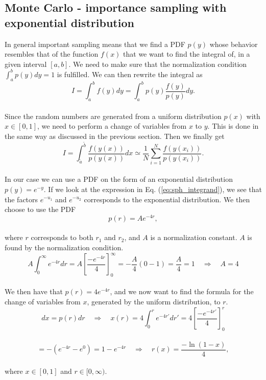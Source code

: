 \documentclass[12pt]{article}
\begin{document}
\begin{flushleft}
\subsection{Monte Carlo - importance sampling with exponential distribution}
In general important sampling means that we find a PDF $p(y)$ whose behavior resembles that of the function $f(x)$ that we want to find the integral of, in a given interval $[a,b]$. We need to make sure that the normalization condition $\int_a^b p(y)dy = 1$ is fulfilled. We can then rewrite the integral as\\
\vspace{5mm}
$$I = \int_a^b f(y)dy = \int_a^b p(y)\frac{f(y)}{p(y)}dy.$$\\
\newpage
Since the random numbers are generated from a uniform distribution $p(x)$ with $x\in [0,1]$, we need to perform a change of variables from $x$ to $y$. This is done in the same way as discussed in the previous section. Then we finally get\\
\vspace{5mm}
$$I = \int_{\tilde{a}}^{\tilde{b}} \frac{f(y(x))}{p(y(x))}dx\simeq \frac{1}{N}\sum\limits_{i=1}^N \frac{f(y(x_i))}{p(y(x_i))}.$$\\
\vspace{5mm} 
In our case we can use a PDF on the form of an exponential distribution $p(y) = e^{-y}$. If we look at the expression in Eq. (\ref{eq:sph_integrand}), we see that the factors $e^{-u_1}$ and $e^{-u_2}$ corresponds to the exponential distribution. We then choose to use the PDF\\
\vspace{5mm}
$$p(r) = Ae^{-4r},$$\\
\vspace{5mm}
where $r$ corresponds to both $r_1$ and $r_2$, and $A$ is a normalization constant. $A$ is found by the normalization condition.
\vspace{5mm}
$$A\int_0^\infty e^{-4r} dr= A\left[\frac{-e^{-4r}}{4}\right]_0^\infty = -\frac{A}{4}\left(0 - 1\right) = \frac{A}{4} = 1\quad\Rightarrow\quad A = 4$$\\
\vspace{5mm}
We then have that $p(r) = 4e^{-4r}$, and we now want to find the formula for the change of variables from $x$, generated by the uniform distribution, to $r$.
\vspace{5mm}
$$dx = p(r)dr \quad\Rightarrow\quad x(r) = 4\int_0^r e^{-4r'} dr' = 4\left[\frac{-e^{-4r'}}{4}\right]_0^r$$\\
\vspace{5mm}
$$= -(e^{-4r}-e^0) = 1-e^{-4r}\quad\Rightarrow\quad r(x) = \frac{-\ln(1-x)}{4},$$\\
\vspace{5mm}
where $x\in [0,1]$ and $r\in[0,\infty)$.
\newpage

\end{flushleft}
\end{document}
